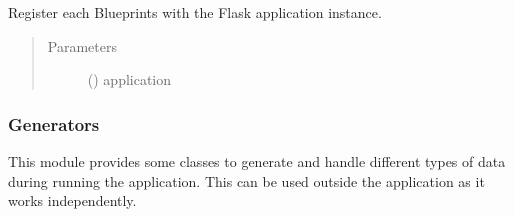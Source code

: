 \documentclass[a4paper,12pt,english]{sphinxmanual}
\begin{document}
\begin{fulllineitems}
\label{\detokenize{project_rst/project:project.__init__.register_blueprints}}
Register each Blueprints with the Flask application instance.
\begin{quote}\begin{description}
\item[{Parameters}] \leavevmode
{} () \textendash{} application

\end{description}\end{quote}

\end{fulllineitems}



\subsubsection{Generators}
\label{\detokenize{project_rst/generator:module-project.generator}}\label{\detokenize{project_rst/generator:generators}}\label{\detokenize{project_rst/generator::doc}}
 

This module provides some classes to generate and handle
different types of data during running the application. This can be used
outside the application as it works independently.
\end{document}
